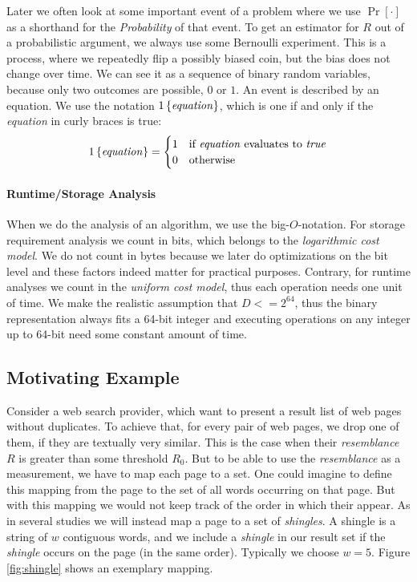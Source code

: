 \documentclass[a4paper]{article}
\begin{document}
Later we often look at some important event of a problem where we use $\Pr[\cdot]$ as a shorthand for the \emph{Probability} of that event. To get an estimator for $R$ out of a probabilistic argument, we always use some Bernoulli experiment. This is a process, where we repeatedly flip a possibly biased coin, but the bias does not change over time. We can see it as a sequence of binary random variables, because only two outcomes are possible, $0$ or $1$. An event is described by an equation. We use the notation $1\left\lbrace \text{\textit{equation}} \right\rbrace$, which is one if and only if the \textit{equation} in curly braces is true:
\begin{equation*}
1\left\lbrace \text{\textit{equation}} \right\rbrace =\begin{cases}
    1 & \text{if \textit{equation} evaluates to \textit{true}} \\
    0 & \text{otherwise}
\end{cases}
\end{equation*}

\paragraph{Runtime/Storage Analysis}

When we do the analysis of an algorithm, we use the big-$O$-notation. For storage requirement analysis we count in bits, which belongs to the \emph{logarithmic cost model}. We do not count in bytes because we later do optimizations on the bit level and these factors indeed matter for practical purposes. Contrary, for runtime analyses we count in the \emph{uniform cost model}, thus each operation needs one unit of time. We make the realistic assumption that $D <= 2^{64}$, thus the binary representation always fits a 64-bit integer and executing operations on any integer up to 64-bit need some constant amount of time.

\subsection{Motivating Example}
Consider a web search provider, which want to present a result list of web pages without duplicates. To achieve that, for every pair of web pages, we drop one of them, if they are textually very similar. This is the case when their \emph{resemblance} $R$ is greater than some threshold $R_0$. But to be able to use the \emph{resemblance} as a measurement, we have to map each page to a set. One could imagine to define this mapping from the page to the set of all words occurring on that page. But with this mapping we would not keep track of the order in which their appear. As in several studies \citep{Broder:1998,BroderGMZ97} we will instead map a page to a set of \emph{shingles}. A shingle is a string of $w$ contiguous words, and we include a \emph{shingle} in our result set if the \emph{shingle} occurs on the page (in the same order). Typically we choose $w = 5$. Figure \vref{fig:shingle} shows an exemplary mapping.
\end{document}
